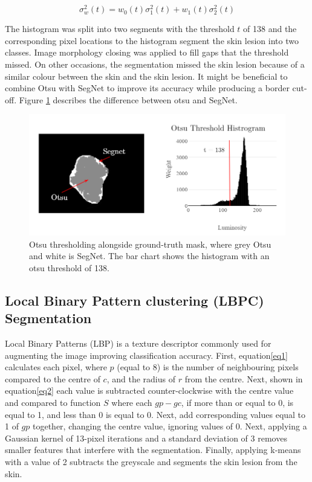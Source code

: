 \begin{equation}
\sigma_w^2(t) = w_0(t)\sigma_1^2(t) + w_1(t)\sigma_2^2(t)
\end{equation}\label{otsu}

The histogram was split into two segments with the threshold $t$ of 138 and the corresponding pixel locations to the histogram segment the skin lesion into two classes. Image morphology closing was applied to fill gaps that the threshold missed. On other occasions, the segmentation missed the skin lesion because of a similar colour between the skin and the skin lesion. It might be beneficial to combine Otsu with SegNet to improve its accuracy while producing a border cut-off. Figure \ref{otsu2} describes the difference between otsu and SegNet.

\begin{figure}
\centering
\includegraphics[scale=0.7]{images/otsu3.png}
\caption{Otsu thresholding alongside ground-truth mask, where grey Otsu and white is SegNet. The bar chart shows the histogram with an otsu threshold of 138.}\label{otsu2}
\end{figure}

\subsection{Local Binary Pattern clustering (LBPC) Segmentation}
Local Binary Patterns (LBP) is a texture descriptor commonly used for augmenting the image improving classification accuracy\cite{Pereira2020, Kaya2016}. First, equation\ref{eq1} calculates each pixel, where $p$ (equal to 8) is the number of neighbouring pixels compared to the centre of $c$, and the radius of $r$ from the centre. Next, shown in equation\ref{eq2} each value is subtracted counter-clockwise with the centre value and compared to function $S$ where each $gp - gc$, if more than or equal to 0, is equal to 1, and less than 0 is equal to 0. Next, add corresponding values equal to 1 of $gp$ together, changing the centre value, ignoring values of 0. Next, applying a Gaussian kernel of 13-pixel iterations and a standard deviation of 3 removes smaller features that interfere with the segmentation. Finally, applying k-means with a value of 2 subtracts the greyscale and segments the skin lesion from the skin.

